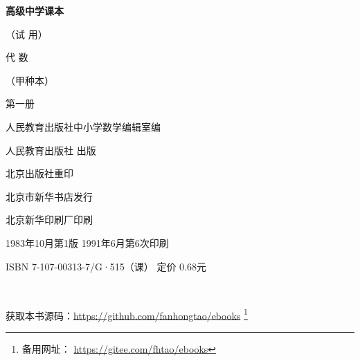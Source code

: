 \begin{titlepage}
    \begin{center}
        \vspace*{3cm}

        {\Large \textbf{高级中学课本} }

        {\Large（试 用）}

        \vspace{1cm}

        {\Huge 代 \qquad 数}

        \vspace{0.5cm}

        {\Large （甲种本）}

        {\Large 第一册}

        \vspace{1cm}
        {\Large 人民教育出版社中小学数学编辑室编}

        \vfill


        人民教育出版社 出版

        北京出版社重印

        北京市新华书店发行

        北京新华印刷厂印刷

        1983年10月第1版  \qquad 1991年6月第6次印刷

        ISBN 7-107-00313-7/G·515（课） \quad 定价 0.68元

        \,

        获取本书源码：\url{https://github.com/fanhongtao/ebooks} \footnote{备用网址： \url{https://gitee.com/fhtao/ebooks} }
    \end{center}
\end{titlepage}
